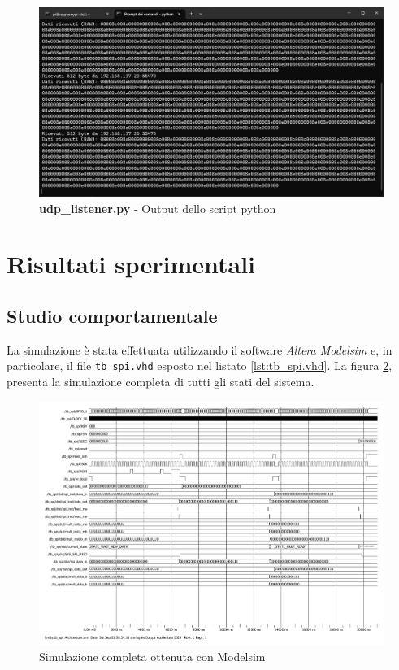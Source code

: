 \documentclass[titlepage]{report}
\begin{document}
	\begin{figure}[H]
		\centering
		\includegraphics[scale=0.55]{./img/output_python.png}
		\caption{\textbf{udp\_listener.py} - Output dello script python}
		\label{fig:udp_listener_output}
	\end{figure}
	
\chapter*{Risultati sperimentali}
\label{ch:risultati_sperimentali}

	\section*{Studio comportamentale}
	\label{sec:studio_comportamentale}
		La simulazione è stata effettuata utilizzando il software \textit{Altera Modelsim} e, in particolare, il file \texttt{tb\_spi.vhd} esposto nel listato \ref{lst:tb_spi.vhd}.
		La figura \ref*{fig:modelsim_sim_completa}, presenta la simulazione completa di tutti gli stati del sistema.

		\begin{figure}[H]
			\centering
			\includegraphics[scale=0.5]{./img/simulation.pdf}
			\caption{Simulazione completa ottenuta con Modelsim}
			\label{fig:modelsim_sim_completa}
		\end{figure}
\end{document}
